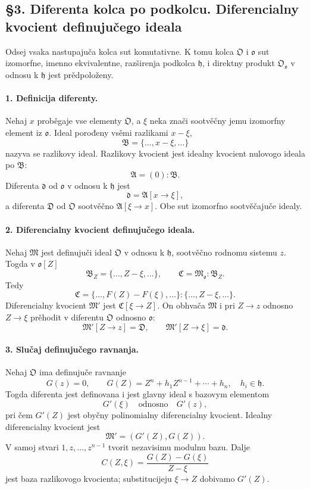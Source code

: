 \documentclass[11pt]{article}
\begin{document}
\subsection*{§3. Diferenta kolca po podkolcu. Diferencialny kvocient definujučego ideala}

Odsej vsaka nastupajuča kolca sut komutativne. K tomu kolca \(\mathfrak O\) i \(\mathfrak o\) sut izomorfne, imenno ekvivalentne, razširenja podkolca \(\mathfrak h\), i direktny produkt \(\mathfrak O_{\mathfrak o}\) v odnosu k \(\mathfrak h\) jest prědpoloženy.

\paragraph{1. Definicija diferenty.}
Nehaj \(x\) proběgaje vse elementy \(\mathfrak O\), a \(\xi\) neka znači sootvěčny jemu izomorfny element iz \(\mathfrak o\). Ideal porođeny vsěmi razlikami \(x-\xi\),
\[
        \mathfrak B=\{\ldots,x-\xi,\ldots\}
\]
nazyva se razlikovy ideal. Razlikovy kvocient jest idealny kvocient nulovogo ideala po \(\mathfrak B\):
\[
        \mathfrak A=(0):\mathfrak B.
\]
Diferenta \(\mathfrak d\) od \(\mathfrak o\) v odnosu k \(\mathfrak h\) jest
\[
        \mathfrak d=\mathfrak A[x\to\xi],
\]
a diferenta \(\mathfrak D\) od \(\mathfrak O\) sootvěčno \(\mathfrak A[\xi\to x]\). Obe sut izomorfno sootvěčajuče idealy.

\paragraph{2. Diferencialny kvocient definujučego ideala.}
Nehaj \(\mathfrak M\) jest definujuči ideal \(\mathfrak O\) v odnosu k \(\mathfrak h\), sootvěčno rodnomu sistemu \(z\). Togda v \(\mathfrak o[Z]\)
\[
        \mathfrak B_Z=\{\ldots,Z-\xi,\ldots\},
        \qquad
        \mathfrak C=\mathfrak M_{\mathfrak o}:\mathfrak B_Z.
\]
Tedy
\[
        \mathfrak C=\{\ldots,F(Z)-F(\xi),\ldots\}:
        \{\ldots,Z-\xi,\ldots\}.
\]
Diferencialny kvocient \(\mathfrak M'\) jest \(\mathfrak C[\xi\to Z]\). On obhvača \(\mathfrak M\) i pri \(Z\to z\) odnosno \(Z\to\xi\) prěhodit v diferentu \(\mathfrak O\) odnosno \(\mathfrak o\):
\[
        \mathfrak M'[Z\to z]=\mathfrak D,
        \qquad
        \mathfrak M'[Z\to \xi]=\mathfrak d.
\]

\paragraph{3. Slučaj definujučego ravnanja.}
Nehaj \(\mathfrak O\) ima definujuče ravnanje
\[
        G(z)=0,\qquad
        G(Z)=Z^n+h_1Z^{n-1}+\cdots+h_n,
        \quad h_i\in\mathfrak h.
\]
Togda diferenta jest definovana i jest glavny ideal s bazovym elementom
\[
        G'(\xi) \quad\text{odnosno}\quad G'(z),
\]
pri čem \(G'(Z)\) jest obyčny polinomialny diferencialny kvocient. Idealny diferencialny kvocient jest
\[
        \mathfrak M'=(G'(Z),G(Z)).
\]
V samoj stvari \(1,z,\ldots,z^{n-1}\) tvorit nezavisimu modulnu bazu. Dalje
\[
        C(Z,\xi)=\frac{G(Z)-G(\xi)}{Z-\xi}
\]
jest baza razlikovogo kvocienta; substitucijeju \(\xi\to Z\) dobivamo \(G'(Z)\).
\end{document}
